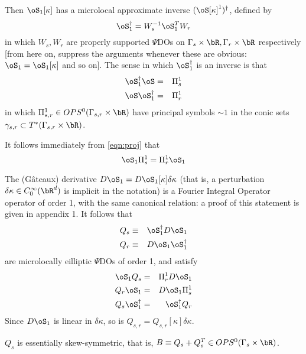 Then 
$\oS_1[\kappa]$ has a microlocal approximate inverse $(\oS[\kappa]^1)^{\dagger}$, defined by 
\begin{equation}
\label{eqn:appinv}
\oS_1^{\dagger} = W_s^{-1}\oS_1^TW_r
\end{equation}
in which $W_s, W_r$ are properly supported $\Psi$DOs on $\Gamma_s \times \bR,\Gamma_r \times \bR$ respectively [from here on, suppress the arguments whenever these are obvious: $\oS_1 = \oS_1[\kappa]$ and so on]. The sense in which $\oS_1^{\dagger}$ is an inverse is that
\begin{eqnarray}
\label{eqn:proj}
\oS_1^{\dagger}\oS &=& \Pi^1_s\\
\oS \oS_1^{\dagger} &=& \Pi^1_r
\end{eqnarray}
in which $\Pi^1_{s,r} \in OPS^0(\Gamma_{s,r}\times \bR)$ have principal symbols $\sim 1$ in the conic sets $\gamma_{s,r} \subset T^*(\Gamma_{s,r}\times \bR)$.

It follows immediately from \ref{eqn:proj} that
\begin{equation}
\label{eqn:picomm}
\oS_1 \Pi^1_s = \Pi^1_r\oS_1
\end{equation}

The (G\^{a}teaux) derivative $D\oS_1 = D\oS_1[\kappa]\delta \kappa$ (that is, a perturbation $\delta \kappa \in C_0^{\infty}(\bR^d)$ is implicit in the notation) is a Fourier Integral Operator operator of order 1, with the same canonical relation: a proof of this statement is given in appendix 1. It follows that
\begin{eqnarray}
\label{eqn:qdef}
Q_s &\equiv& \oS_1^{\dagger}D\oS_1 \nonumber \\
Q_r &\equiv& D\oS_1 \oS_1^{\dagger} 
\end{eqnarray}
are microlocally eilliptic $\Psi$DOs of order 1, and satisfy
\begin{eqnarray}
\label{eqn:qrel}
\oS_1 Q_s &=& \Pi^1_r D\oS_1 \nonumber \\
Q_r \oS_1 &=& D\oS_1 \Pi^1_s \nonumber \\
Q_s\oS_1^{\dagger} &=& \oS_1^{\dagger} Q_r
\end{eqnarray}
Since $D\oS_1$ is linear in $\delta \kappa$, so is $Q_{s,r} = Q_{s,r}[\kappa]\delta \kappa$.

\begin{lemma}\label{thm:qskew} $Q_s$ is essentially skew-symmetric, that is, $B \equiv Q_s+Q_s^T \in OPS^0(\Gamma_s \times \bR)$.
\end{lemma}

